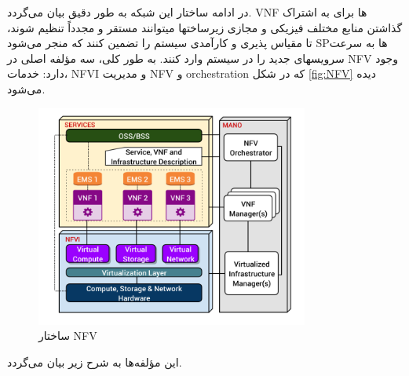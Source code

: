 در ادامه ساختار این شبکه به طور دقیق بیان می‌گردد.
 VNF
ها برای به اشتراک گذاشتن منابع مختلف فیزیکی و مجازی زیرساختها میتوانند مستقر و مجدداً تنظیم شوند، تا مقیاس پذیری و کارآمدی سیستم را تضمین کنند که منجر می‌شود SPها به سرعت سرویسهای جدید را در سیستم وارد کنند.
 به طور کلی، سه مؤلفه اصلی در NFV وجود دارد:
 خدمات، NFVI و مدیریت NFV و orchestration
 که در شکل \eqref{fig:NFV} دیده می‌شود. 
 \begin{figure}
  \centering
    \includegraphics[width=0.8\textwidth]{./fig/NFV}
  \caption{ساختار NFV \cite{NFVArch}}
  \label{fig:NFV}
\end{figure} 
این مؤلفه‌ها به شرح زیر بیان می‌گردد\cite{NFVArch}.
